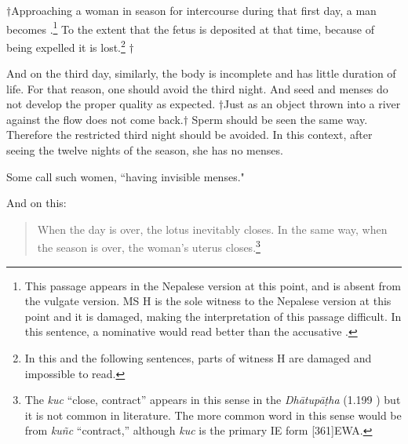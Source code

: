 \begin{translation}
$\dag$Approaching a woman in season for intercourse during that first
day, a man becomes .\footnote{This
    passage appears in the Nepalese version at this point, and is absent
    from the vulgate version.  MS H is the sole witness to the Nepalese
    version at this point and it is damaged, making the interpretation of this
    passage difficult.  In this sentence, a nominative would read
    better than the accusative .} %
    To the extent that the fetus is deposited at that time, because of
    being expelled it is lost.\footnote{In this and the following sentences, parts of 
    witness H are damaged and impossible to read.} $\dag$
    
    And on the third day, similarly, the body is incomplete and has little duration of 
    life.  For that reason, one should avoid the third night. 
    And seed and menses do not develop the proper quality as expected.     
   $\dag$Just as an object thrown into a river against the flow does not come 
   back.$\dag$  Sperm should be seen the same way.  Therefore the restricted third 
   night should be avoided.  In this context, after seeing the twelve nights of the 
   season, she has no menses. 

\item [6cd]

Some call such women, “having invisible menses."

\item [3.3.9]

And on this:
\begin{quote}
    When the day is over, the lotus inevitably closes.  In the same
way, when the season is over, the woman's uterus
closes.\footnote{The \root \emph{kuc} “close, contract” appears in
    this sense in the \emph{Dhātupāṭha} (1.199 ) but it
    is not common in literature.  The more common word in this sense
    would be from \root \emph{kuñc} “contract,” although \emph{kuc} is
    the primary IE form [361]{EWA}.}
\end{quote}


\bigskip


\end{translation}
